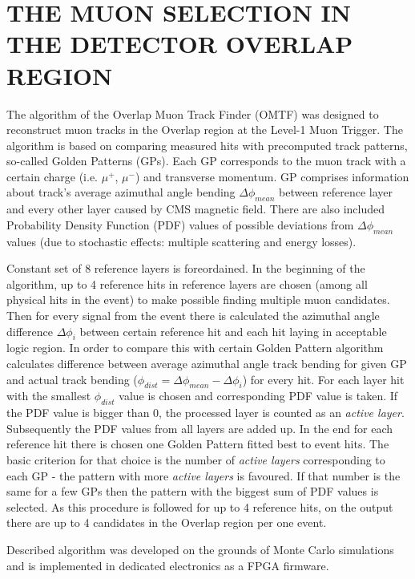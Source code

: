 \section{THE MUON SELECTION IN THE DETECTOR OVERLAP REGION}

The algorithm of the Overlap Muon Track Finder (OMTF) was designed to reconstruct muon tracks in the Overlap region at the Level-1 Muon Trigger. The algorithm is based on comparing measured hits with precomputed track patterns, so-called Golden Patterns (GPs). Each GP corresponds to the muon track with a certain charge (i.e. $\mu^{+}$, $\mu^{-}$) and transverse momentum. GP comprises information about track's average azimuthal angle bending $\Delta \phi_{mean}$ between reference layer and every other layer caused by CMS magnetic field. There are also included Probability Density Function (PDF) values of possible deviations from $\Delta \phi_{mean}$ values (due to stochastic effects: multiple scattering and energy losses). 

Constant set of 8 reference layers is foreordained. In the beginning of the algorithm, up to 4 reference hits in reference layers are chosen (among all physical hits in the event) to make possible finding multiple muon candidates. Then for every signal from the event there is calculated the azimuthal angle difference $\Delta \phi_{i}$ between certain reference hit and each hit laying in acceptable logic region. In order to compare this with certain Golden Pattern algorithm calculates difference between average azimuthal angle track bending for given GP and actual track bending ($\phi_{dist} = \Delta\phi_{mean} - \Delta\phi_{i}$)%
 for every hit. For each layer hit with the smallest $\phi_{dist}$ value is chosen and corresponding PDF value is taken. If the PDF value is bigger than 0, the processed layer is counted as an \textit{active layer}. Subsequently the PDF values from all layers are added up. In the end for each reference hit there is chosen one Golden Pattern fitted best to event hits. The basic criterion for that choice is the number of \textit{active layers} corresponding to each GP - the pattern with more \textit{active layers} is favoured. If that number is the same for a few GPs then the pattern with the biggest sum of PDF values is selected. As this procedure is followed for up to 4 reference hits, on the output there are up to 4 candidates in the Overlap region per one event.

Described algorithm was developed on the grounds of Monte Carlo simulations and is implemented in dedicated electronics as a FPGA firmware.
%
\cite{OMTF-Wilga2014}
